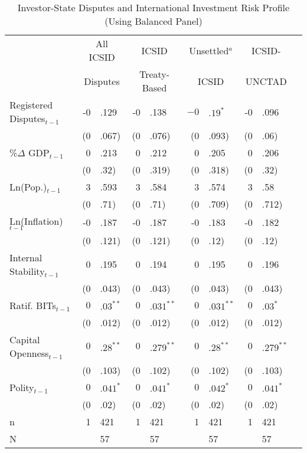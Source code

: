 \documentclass[12pt,onesided]{amsart}
\begin{document}
\begin{table}[ht]
\centering
\caption{Investor-State Disputes and International Investment Risk Profile (Using Balanced Panel)}
\label{tab:dispRepLevelBal}
\begin{tabular}{lr@{} lr@{}lr@{}lr@{}lr@{}}
  \hline\hline
  & \multicolumn{2}{c}{All ICSID} & \multicolumn{2}{c}{ICSID} & \multicolumn{2}{c}{Unsettled$^{a}$} & \multicolumn{2}{c}{ICSID-} \\ 
  & \multicolumn{2}{c}{Disputes} & \multicolumn{2}{c}{Treaty-Based} & \multicolumn{2}{c}{ICSID} & \multicolumn{2}{c}{UNCTAD} \\
 \hline
Registered Disputes$_{t-1}$ & -0&.129 & -0&.138 & $-0$&$.19^{\ast}$ & -0&.096 \\ 
   & (0&.067) & (0&.076) & (0&.093) & (0&.06) \\ 
  \%$\Delta$ GDP$_{t-1}$ & 0&.213 & 0&.212 & 0&.205 & 0&.206 \\ 
   & (0&.32) & (0&.319) & (0&.318) & (0&.32) \\ 
  Ln(Pop.)$_{t-1}$ & 3&.593 & 3&.584 & 3&.574 & 3&.58 \\ 
   & (0&.71) & (0&.71) & (0&.709) & (0&.712) \\ 
  Ln(Inflation)$_{t-1}$ & -0&.187 & -0&.187 & -0&.183 & -0&.182 \\ 
   & (0&.121) & (0&.121) & (0&.12) & (0&.12) \\ 
  Internal Stability$_{t-1}$ & 0&.195 & 0&.194 & 0&.195 & 0&.196 \\ 
   & (0&.043) & (0&.043) & (0&.043) & (0&.043) \\ 
  Ratif. BITs$_{t-1}$ & $0$&$.03^{\ast\ast}$ & $0$&$.031^{\ast\ast}$ & $0$&$.031^{\ast\ast}$ & $0$&$.03^{\ast}$ \\ 
   & (0&.012) & (0&.012) & (0&.012) & (0&.012) \\ 
  Capital Openness$_{t-1}$ & $0$&$.28^{\ast\ast}$ & $0$&$.279^{\ast\ast}$ & $0$&$.28^{\ast\ast}$ & $0$&$.279^{\ast\ast}$ \\ 
   & (0&.103) & (0&.102) & (0&.102) & (0&.103) \\ 
  Polity$_{t-1}$ & $0$&$.041^{\ast}$ & $0$&$.041^{\ast}$ & $0$&$.042^{\ast}$ & $0$&$.041^{\ast}$ \\ 
   & (0&.02) & (0&.02) & (0&.02) & (0&.02) \\ 
   \hline
n & 1&421 & 1&421 & 1&421 & 1&421 \\ 
  N && 57 && 57 && 57 && 57 \\ 

\end{tabular}
\end{table}
\end{document}
